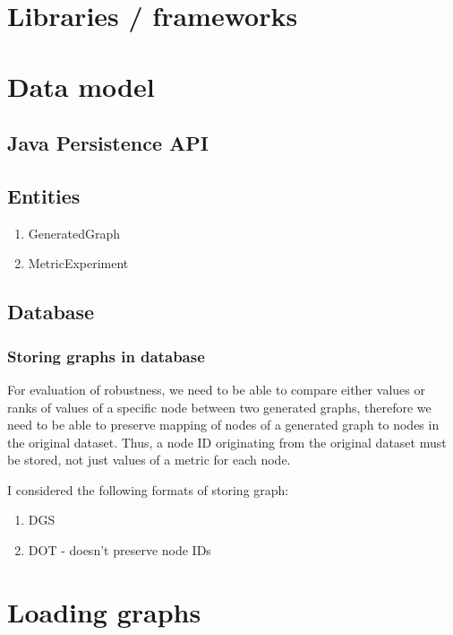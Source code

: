 \section{Libraries / frameworks}




\section{Data model}

\subsection{Java Persistence API}

\subsection{Entities}
\begin{enumerate}
    \item GeneratedGraph
    \item MetricExperiment
\end{enumerate}

\subsection{Database}

\subsubsection{Storing graphs in database}

For evaluation of robustness, we need to be able to compare either values or ranks of values of a specific node between two generated graphs, therefore we need to be able to preserve mapping of nodes of a generated graph to nodes in the original dataset.
Thus, a node ID originating from the original dataset must be stored, not just values of a metric for each node.

I considered the following formats of storing graph:
\begin{enumerate}
    \item DGS
    \item DOT - doesn't preserve node IDs
\end{enumerate}


\section{Loading graphs}

